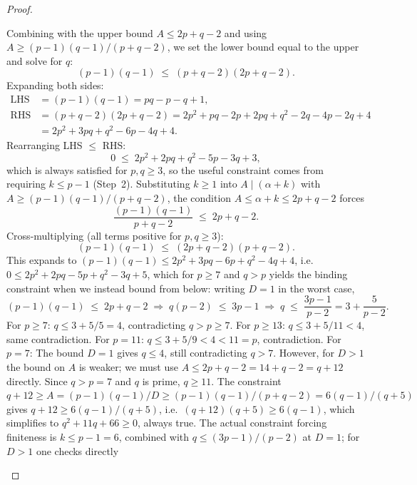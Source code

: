 \documentclass[12pt,a4paper]{amsart}
\theoremstyle{definition}
\begin{document}
\begin{proof}
\begin{itemize}
        Combining with the upper bound $A \le 2p + q - 2$ and using
        $A \ge (p-1)(q-1)/(p+q-2)$, we set the lower bound equal to the
        upper and solve for $q$:
        \[
          (p-1)(q-1) \;\le\; (p+q-2)(2p+q-2).
        \]
        Expanding both sides:
        \begin{align*}
          \text{LHS} &= (p-1)(q-1) = pq - p - q + 1,\\
          \text{RHS} &= (p+q-2)(2p+q-2)
                      = 2p^2 + pq - 2p + 2pq + q^2 - 2q - 4p - 2q + 4\\
                     &= 2p^2 + 3pq + q^2 - 6p - 4q + 4.
        \end{align*}
        Rearranging LHS $\le$ RHS:
        \[
          0 \;\le\; 2p^2 + 2pq + q^2 - 5p - 3q + 3,
        \]
        which is always satisfied for $p, q \ge 3$, so the useful constraint
        comes from requiring $k \le p-1$ (Step~2).  Substituting $k \ge 1$
        into $A \mid (\alpha + k)$ with $A \ge (p-1)(q-1)/(p+q-2)$, the
        condition $A \le \alpha + k \le 2p + q - 2$ forces
        \[
          \frac{(p-1)(q-1)}{p+q-2} \;\le\; 2p + q - 2.
        \]
        Cross-multiplying (all terms positive for $p, q \ge 3$):
        \[
          (p-1)(q-1) \;\le\; (2p+q-2)(p+q-2).
        \]
        This expands to $(p-1)(q-1) \le 2p^2 + 3pq - 6p + q^2 - 4q + 4$,
        i.e.\ $0 \le 2p^2 + 2pq - 5p + q^2 - 3q + 5$, which for $p \ge 7$ and
        $q > p$ yields the binding constraint when we instead bound from below:
        writing $D = 1$ in the worst case,
        \[
          (p-1)(q-1) \;\le\; 2p + q - 2
          \;\Longrightarrow\;
          q(p-2) \;\le\; 3p - 1
          \;\Longrightarrow\;
          q \;\le\; \frac{3p-1}{p-2} = 3 + \frac{5}{p-2}.
        \]
        For $p \ge 7$: $q \le 3 + 5/5 = 4$, contradicting $q > p \ge 7$.
        For $p \ge 13$: $q \le 3 + 5/11 < 4$, same contradiction.
        For $p = 11$: $q \le 3 + 5/9 < 4 < 11 = p$, contradiction.
        For $p = 7$: The bound $D = 1$ gives $q \le 4$, still contradicting
        $q > 7$.  However, for $D > 1$ the bound on $A$ is weaker; we must
        use $A \le 2p + q - 2 = 14 + q - 2 = q + 12$ directly.  Since
        $q > p = 7$ and $q$ is prime, $q \ge 11$.  The constraint
        $q + 12 \ge A = (p-1)(q-1)/D \ge (p-1)(q-1)/(p+q-2) = 6(q-1)/(q+5)$
        gives $q + 12 \ge 6(q-1)/(q+5)$, i.e.\ $(q+12)(q+5) \ge 6(q-1)$,
        which simplifies to $q^2 + 11q + 66 \ge 0$, always true.
        The actual constraint forcing finiteness is $k \le p - 1 = 6$, combined
        with $q \le (3p-1)/(p-2)$ at $D=1$; for $D > 1$ one checks directly

\end{itemize}
\end{proof}
\end{document}
